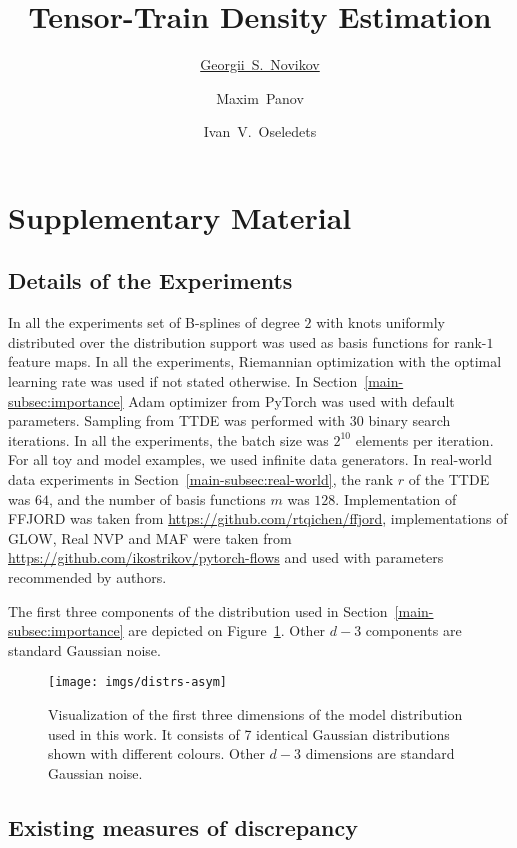 \documentclass[accepted]{uai2021}
\title{Tensor-Train Density Estimation}
\author[1]{\href{mailto:Georgii Novikov <georgii.novikov@skoltech.ru>?Subject=Tensor-Train Density Estimation}{Georgii~S.~Novikov}{}} %
\author[1]{Maxim~Panov}
\author[1]{Ivan~V.~Oseledets}
\affil[1]{%
    CDISE, Skolkovo Institute of Science and Technology \\
    Moscow, Russia
}
\begin{document}
\maketitle

\appendix

\section{Supplementary Material}
\label{sec:suppl}

\subsection{Details of the Experiments}
\label{subsec:setups}
  In all the experiments set of B-splines of degree $2$ with knots uniformly distributed over the distribution support was used as basis functions for rank-$1$ feature maps. In all the experiments, Riemannian optimization with the optimal learning rate was used if not stated otherwise. In Section~\ref{main-subsec:importance} Adam optimizer from PyTorch was used with default parameters. Sampling from TTDE was performed with 30 binary search iterations. In all the experiments, the batch size was $2^{10}$ elements per iteration. For all toy and model examples, we used infinite data generators. In real-world data experiments in Section~\ref{main-subsec:real-world}, the rank $r$ of the TTDE was $64$, and the number of basis functions $m$ was $128$. Implementation of FFJORD was taken from \url{https://github.com/rtqichen/ffjord}, implementations of GLOW, Real NVP and MAF were taken from \url{https://github.com/ikostrikov/pytorch-flows} and used with parameters recommended by authors.
  
  The first three components of the distribution used in Section~\ref{main-subsec:importance} are depicted on Figure~\ref{fig:distrs:asym}. Other $d - 3$ components are standard Gaussian noise.
  \begin{figure}[t]
    \centering
    \texttt{[image: imgs/distrs-asym]}
    \caption{Visualization of the first three dimensions of the model distribution used in this work. It consists of 7 identical Gaussian distributions shown with different colours. Other $d - 3$ dimensions are standard Gaussian noise. }
  \label{fig:distrs:asym}
  \end{figure}
  
\subsection{Existing measures of discrepancy}
\label{sup:losses}
  
\end{document}
